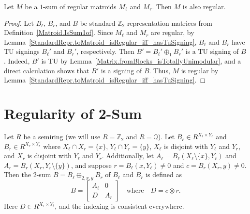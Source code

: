 \begin{theorem}
    \label{Matroid.IsSum1of.isRegular}
    \leanok
    Let $M$ be a $1$-sum of regular matroids $M_{\ell}$ and $M_{r}$. Then $M$ is also regular.
\end{theorem}

\begin{proof}
    \leanok
    Let $B_{\ell}$, $B_{r}$, and $B$ be standard $\mathbb{Z}_{2}$ representation matrices from Definition~\ref{Matroid.IsSum1of}. Since $M_{\ell}$ and $M_{r}$ are regular, by Lemma~\ref{StandardRepr.toMatroid_isRegular_iff_hasTuSigning}, $B_{\ell}$ and $B_{r}$ have TU signings $B_{\ell}'$ and $B_{r}'$, respectively. Then $B' = B_{\ell}' \oplus_{1} B_{r}'$ is a TU signing of $B$. Indeed, $B'$ is TU by Lemma~\ref{Matrix.fromBlocks_isTotallyUnimodular}, and a direct calculation shows that $B'$ is a signing of $B$. Thus, $M$ is regular by Lemma~\ref{StandardRepr.toMatroid_isRegular_iff_hasTuSigning}.
\end{proof}


\chapter{Regularity of 2-Sum}

\begin{definition}
    \label{standardReprSum2}
    \leanok
    Let $R$ be a semiring (we will use $R = \mathbb{Z}_{2}$ and $R = \mathbb{Q}$). Let $B_{\ell} \in R^{X_{\ell} \times Y_{\ell}}$ and $B_{r} \in R^{X_{r} \times Y_{r}}$ where $X_{\ell} \cap X_{r} = \{x\}$, $Y_{\ell} \cap Y_{r} = \{y\}$, $X_{\ell}$ is disjoint with $Y_{\ell}$ and $Y_{r}$, and $X_{r}$ is disjoint with $Y_{\ell}$ and $Y_{r}$. Additionally, let $A_{\ell} = B_{\ell} (X_{\ell} \setminus \{x\}, Y_{\ell})$ and $A_{r} = B_{r} (X_{r}, Y_{r} \setminus \{y\})$, and suppose $r = B_{\ell} (x, Y_{\ell}) \neq 0$ and $c = B_{r} (X_{r}, y) \neq 0$. Then the $2$-sum $B = B_{\ell} \oplus_{2, x, y} B_{r}$ of $B_{\ell}$ and $B_{r}$ is defined as
    \[
        B = \begin{bmatrix} A_{\ell} & 0 \\ D & A_{r} \end{bmatrix}
        \quad \text{where} \quad
        D = c \otimes r.
    \]
    Here $D \in R^{X_{r} \times Y_{\ell}}$, and the indexing is consistent everywhere.
\end{definition}

